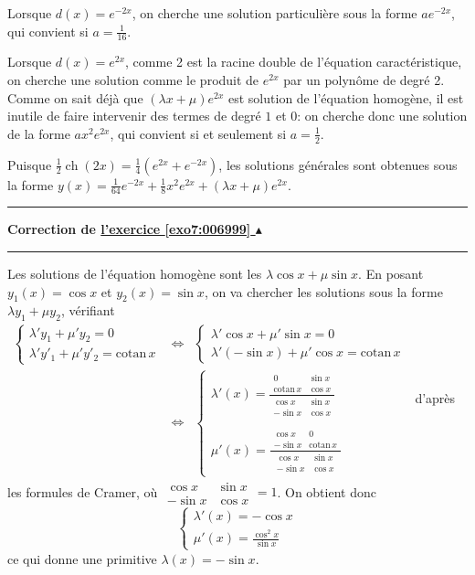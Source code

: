 \documentclass[11pt,a4paper]{article}
\newcommand{\ch}{\mathop{\mathrm{ch}}\nolimits}
\newcounter{exo}
\newcommand{\correction}[1]{\hypertarget{cor7:#1}{}\label{cor7:#1}{\bf Correction de \hyperlink{exo7:#1}{l'exercice \ref{exo7:#1} $\blacktriangle$}}\vspace{1mm}\hrule\vspace{1mm}}
\newcommand{\fincorrection}{\vspace{1mm}\hrule\vspace*{7mm}}
\begin{document}
Lorsque $d(x)=e^{-2x}$, on cherche une solution particulière sous la forme $ae^{-2x}$, 
qui convient si $a=\frac{1}{16}$.

Lorsque $d(x)=e^{2x}$, comme 2 est la racine double de l'équation caractéristique, 
on cherche une solution comme le produit de $e^{2x}$ par un polyn\^ome de degré 2. 
Comme on sait déjà que $(\lambda x+\mu)e^{2x}$ est solution de l'équation homogène, 
il est inutile de faire intervenir des termes de degré $1$ et $0$: on cherche 
donc une solution de la forme $ax^2e^{2x}$, qui convient si et seulement si $a=\frac{1}{2}$. 

Puisque $\frac{1}{2}\ch(2x) =\frac{1}{4}(e^{2x}+e^{-2x})$, les solutions générales sont obtenues sous 
la forme $y(x)=\frac{1}{64}e^{-2x}+\frac{1}{8}x^2e^{2x}+(\lambda x+\mu)e^{2x}$.
\fincorrection
\correction{006999}
Les solutions de l'équation homogène sont les $\lambda\cos x+\mu\sin x$. 
En posant $y_1(x)=\cos x$ et $y_2(x)=\sin x$, on va chercher les solutions sous 
la forme $\lambda y_1+\mu y_2$, vérifiant
$\begin{eqnarray*}
\left\{\begin{array}{l}
\lambda'y_1+\mu'y_2=0\\
\lambda'y'_1+\mu'y'_2=\mathrm{cotan}\, x
\end{array}\right.
&\Longleftrightarrow&
\left\{\begin{array}{l}
\lambda'\cos x+\mu'\sin x=0\\
\lambda'(-\sin x)+\mu'\cos x=\mathrm{cotan}\, x
\end{array}\right.\\
\ &\Longleftrightarrow&
\left\{\begin{array}{l}
\lambda'(x)=\frac{\begin{array}{|cc|}0&\sin x\\\mathrm{cotan}\, x&\cos x \end{array}}{\begin{array}{|cc|}\cos x&\sin x\\-\sin x&\cos x \end{array}}\\
\ \\
\mu'(x)=\frac{\begin{array}{|cc|}\cos x&0\\-\sin x&\mathrm{cotan}\, x \end{array}}{\begin{array}{|cc|}\cos x&\sin x\\-\sin x&\cos x \end{array}}
\end{array}\right.
\end{eqnarray*}$
d'après les formules de Cramer, où $\begin{array}{|cc|}\cos x&\sin x\\-\sin x&\cos x \end{array}=1$. On obtient donc 
$$\left\{\begin{array}{l}
\lambda'(x)=-\cos x\\
\mu'(x)=\frac{\cos^2x}{\sin x}
\end{array}\right.
$$
ce qui donne une primitive $\lambda(x)=-\sin x$. 
\end{document}
